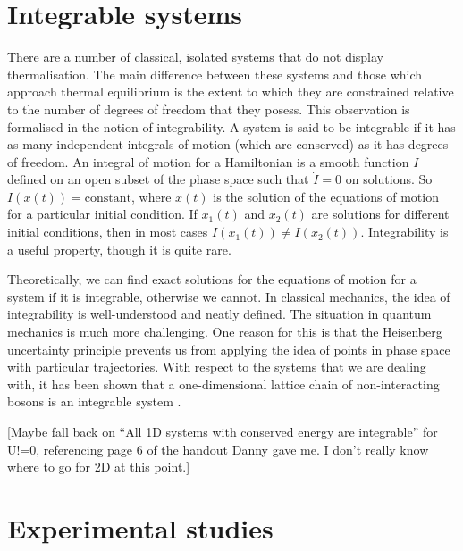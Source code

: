 \documentclass[a4paper,10pt]{article}
\theoremstyle{plain}
\begin{document}
\section{Integrable systems}
There are a number of classical, isolated systems that do not display 
thermalisation. The main difference between these systems and those which 
approach thermal equilibrium is the extent to which they are constrained 
relative to the number of degrees of freedom that they posess. This observation 
is formalised in the notion of integrability. A system is said to be integrable 
if it has  as
many independent integrals of motion (which are conserved) as it has degrees 
of freedom. An integral of motion for a Hamiltonian is a smooth function 
$I$ defined on an open subset of the phase space such that $\dot{I}=0$ on 
solutions. So $I(x(t))=\text{constant}$, where $x(t)$ is the solution of the 
equations of motion for a particular initial condition. If $x_1(t)$ and 
$x_2(t)$ are solutions for different initial conditions, then in most cases 
$I(x_1(t))\ne I(x_2(t))$. Integrability is a useful property, though it is 
quite rare.

Theoretically, we can find exact solutions for the equations of motion for a 
system if it is integrable, otherwise we cannot. In classical mechanics, the 
idea of integrability is well-understood and neatly defined. The situation in 
quantum mechanics is much more challenging. One reason for this is that
the Heisenberg uncertainty principle prevents us from applying the idea of 
points in phase space with particular trajectories. With respect to the systems 
that we are dealing with, it has been shown that a one-dimensional lattice 
chain of non-interacting bosons is an integrable system \cite{Rigol2007}.



 [Maybe fall back on ``All 1D systems with conserved 
energy are integrable'' for U!=0, referencing page 6 of the handout Danny gave 
me. I don't really know where to go for 2D at this point.]

\newpage
\section{Experimental studies}
\end{document}
